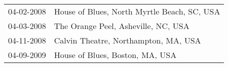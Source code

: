 \begin{supertabular}{ll}
 04-02-2008 &  House of Blues, North Myrtle Beach, SC, USA \\
 04-03-2008 &          The Orange Peel, Asheville, NC, USA \\
 04-11-2008 &         Calvin Theatre, Northampton, MA, USA \\
 04-09-2009 &              House of Blues, Boston, MA, USA \\
\end{supertabular}
